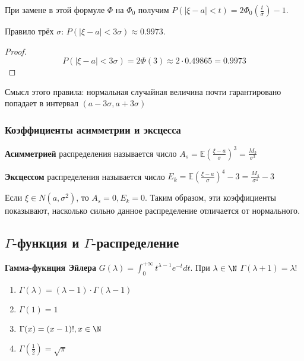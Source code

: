 \begin{enumerate}
          При замене в этой формуле \(\Phi\) на \(\Phi_0\) получим \(P(|\xi - a| < t) = 2\Phi_0\left( \frac{t}{\sigma} \right) - 1\).

          Правило трёх \(\sigma\): \(P(|\xi - a| < 3\sigma) \approx 0.9973\).
          \begin{proof}
              \[P(|\xi - a| < 3\sigma) = 2\Phi(3) \approx 2 \cdot 0.49865 = 0.9973\]
          \end{proof}

          Смысл этого правила: нормальная случайная величина почти гарантировано попадает в интервал \((a - 3\sigma, a + 3\sigma)\)
\end{enumerate}

\subsubsection{Коэффициенты асимметрии и эксцесса}

\begin{definition}
    \textbf{Асимметрией} распределения называется число \(A_s = \mathbb{E}\left( \frac{\xi - a}{\sigma} \right)^3 = \frac{M_3}{\sigma^3}\)
\end{definition}

\begin{definition}
    \textbf{Эксцессом} распределения называется число \(E_k = \mathbb{E}\left( \frac{\xi - a}{\sigma} \right)^4 - 3 = \frac{M_4}{\sigma^4} - 3\)
\end{definition}

Если \(\xi \in N(a, \sigma^2)\), то \(A_s = 0, E_k = 0\). Таким образом, эти коэффициенты показывают, насколько сильно данное распределение отличается от нормального.

\subsection{\(\Gamma\)-функция и \(\Gamma\)-распределение}

\begin{definition}
    \textbf{Гамма-фукнция Эйлера} \(G(\lambda) = \int_0^{+\infty} t^{\lambda - 1} e^{ - t}dt\). При \(\lambda \in \N\) \(\Gamma(\lambda + 1) = \lambda!\)
\end{definition}

\begin{prop}\itemfix
    \begin{enumerate}
        \item \(\Gamma(\lambda) = (\lambda - 1) \cdot \Gamma(\lambda - 1)\)
        \item \(\Gamma(1) = 1\)
        \item \(\Gamma(x) = (x - 1)!, x \in \N\)
        \item \(\Gamma\left( \frac{1}{2} \right) = \sqrt{\pi}\)
    \end{enumerate}
\end{prop}

